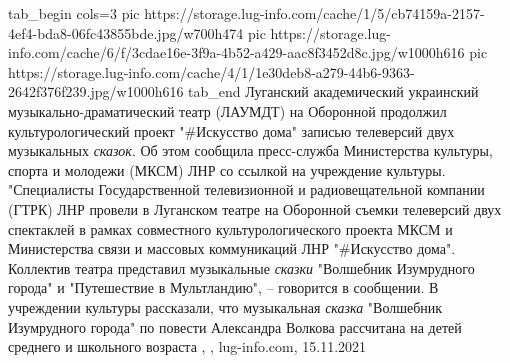 \ifcmt
  tab_begin cols=3
     pic https://storage.lug-info.com/cache/1/5/cb74159a-2157-4ef4-bda8-06fc43855bde.jpg/w700h474
     pic https://storage.lug-info.com/cache/6/f/3cdae16e-3f9a-4b52-a429-aac8f3452d8c.jpg/w1000h616
		 pic https://storage.lug-info.com/cache/4/1/1e30deb8-a279-44b6-9363-2642f376f239.jpg/w1000h616
  tab_end
\fi
Луганский академический украинский музыкально-драматический театр (ЛАУМДТ) на
Оборонной продолжил культурологический проект "\#Искусство дома" записью
телеверсий двух музыкальных \emph{сказок}. Об этом сообщила пресс-служба
Министерства культуры, спорта и молодежи (МКСМ) ЛНР со ссылкой на учреждение
культуры.  "Специалисты Государственной телевизионной и радиовещательной
компании (ГТРК) ЛНР провели в Луганском театре на Оборонной съемки телеверсий
двух спектаклей в рамках совместного культурологического проекта МКСМ и
Министерства связи и массовых коммуникаций ЛНР "\#Искусство дома". Коллектив
театра представил музыкальные \emph{сказки} "Волшебник Изумрудного города" и
"Путешествие в Мультландию", – говорится в сообщении.  В учреждении культуры
рассказали, что музыкальная \emph{сказка} "Волшебник Изумрудного города" по
повести Александра Волкова рассчитана на детей среднего и школьного возраста
, 
, lug-info.com, 15.11.2021
